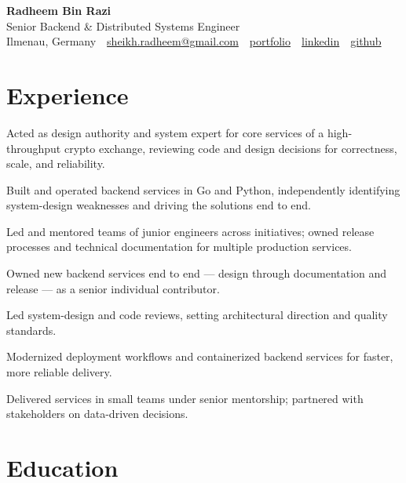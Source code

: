 \documentclass[11pt,a4paper]{resume}
\makeatletter
\newcommand{\Portfolio}{https://radheem.github.io/my-cv}
\newcommand{\PortfolioText}{portfolio}
\newcommand{\GitHub}{https://github.com/radheem}
\newcommand{\LinkedIn}{https://www.linkedin.com/in/radheem-razi}
\newcommand{\Email}{sheikh.radheem@gmail.com}
\makeatother
\begin{document}
\begin{center}
  {\huge\bfseries Radheem Bin Razi}\\[3pt]
  {\large Senior Backend \& Distributed Systems Engineer}\\[6pt]
  \small
  Ilmenau, Germany \,\textbar\,
  \href{mailto:\Email}{\Email} \,\textbar\,
  \href{\Portfolio}{\PortfolioText} \,\textbar\,
  \href{\LinkedIn}{linkedin} \,\textbar\,
  \href{\GitHub}{github}
\end{center}
\vspace{2pt}

\section{Experience}

\bullets
  \item Acted as design authority and system expert for core services of a high-throughput crypto exchange, reviewing code and design decisions for correctness, scale, and reliability.
  \item Built and operated backend services in Go and Python, independently identifying system-design weaknesses and driving the solutions end to end.
  \item Led and mentored teams of junior engineers across initiatives; owned release processes and technical documentation for multiple production services.
\bulletsend
\vspace{3pt}
\bullets
  \item Owned new backend services end to end — design through documentation and release — as a senior individual contributor.
  \item Led system-design and code reviews, setting architectural direction and quality standards.
  \item Modernized deployment workflows and containerized backend services for faster, more reliable delivery.
\bulletsend
\vspace{3pt}
\bullets
  \item Delivered services in small teams under senior mentorship; partnered with stakeholders on data-driven decisions.
\bulletsend
\vspace{3pt}

\section{Education}
\end{document}
